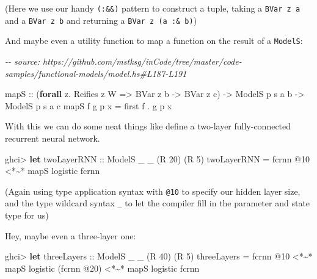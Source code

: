 \documentclass[]{article}
\newenvironment{Shaded}{}{}
\newcommand{\CommentTok}[1]{\textcolor[rgb]{0.38,0.63,0.69}{\textit{#1}}}
\newcommand{\DataTypeTok}[1]{\textcolor[rgb]{0.56,0.13,0.00}{#1}}
\newcommand{\DecValTok}[1]{\textcolor[rgb]{0.25,0.63,0.44}{#1}}
\newcommand{\KeywordTok}[1]{\textcolor[rgb]{0.00,0.44,0.13}{\textbf{#1}}}
\newcommand{\NormalTok}[1]{#1}
\newcommand{\OperatorTok}[1]{\textcolor[rgb]{0.40,0.40,0.40}{#1}}
\newcommand{\OtherTok}[1]{\textcolor[rgb]{0.00,0.44,0.13}{#1}}
\begin{document}
(Here we use our handy \texttt{(:\&\&)} pattern to construct a tuple, taking a
\texttt{BVar\ z\ a} and a \texttt{BVar\ z\ b} and returning a
\texttt{BVar\ z\ (a\ :\&\ b)})

And maybe even a utility function to map a function on the result of a
\texttt{ModelS}:

\begin{Shaded}
\begin{Highlighting}[]
\CommentTok{{-}{-} source: https://github.com/mstksg/inCode/tree/master/code{-}samples/functional{-}models/model.hs\#L187{-}L191}

\NormalTok{mapS}
\OtherTok{    ::}\NormalTok{ (}\KeywordTok{forall}\NormalTok{ z}\OperatorTok{.} \DataTypeTok{Reifies}\NormalTok{ z }\DataTypeTok{W} \OtherTok{=\textgreater{}} \DataTypeTok{BVar}\NormalTok{ z b }\OtherTok{{-}\textgreater{}} \DataTypeTok{BVar}\NormalTok{ z c)}
    \OtherTok{{-}\textgreater{}} \DataTypeTok{ModelS}\NormalTok{ p s a b}
    \OtherTok{{-}\textgreater{}} \DataTypeTok{ModelS}\NormalTok{ p s a c}
\NormalTok{mapS f g p x }\OtherTok{=}\NormalTok{ first f }\OperatorTok{.}\NormalTok{ g p x}
\end{Highlighting}
\end{Shaded}

With this we can do some neat things like define a two-layer fully-connected
recurrent neural network.

\begin{Shaded}
\begin{Highlighting}[]
\NormalTok{ghci}\OperatorTok{\textgreater{}} \KeywordTok{let}\OtherTok{ twoLayerRNN ::} \DataTypeTok{ModelS}\NormalTok{ \_ \_ (}\DataTypeTok{R} \DecValTok{20}\NormalTok{) (}\DataTypeTok{R} \DecValTok{5}\NormalTok{)}
\NormalTok{          twoLayerRNN }\OtherTok{=}\NormalTok{ fcrnn }\OperatorTok{@}\DecValTok{10} \OperatorTok{\textless{}*\textasciitilde{}*}\NormalTok{ mapS logistic fcrnn}
\end{Highlighting}
\end{Shaded}

(Again using type application syntax with \texttt{@10} to specify our hidden
layer size, and the type wildcard syntax \texttt{\_} to let the compiler fill in
the parameter and state type for us)

Hey, maybe even a three-layer one:

\begin{Shaded}
\begin{Highlighting}[]
\NormalTok{ghci}\OperatorTok{\textgreater{}} \KeywordTok{let}\OtherTok{ threeLayers ::} \DataTypeTok{ModelS}\NormalTok{ \_ \_ (}\DataTypeTok{R} \DecValTok{40}\NormalTok{) (}\DataTypeTok{R} \DecValTok{5}\NormalTok{)}
\NormalTok{          threeLayers }\OtherTok{=}\NormalTok{ fcrnn }\OperatorTok{@}\DecValTok{10}
                   \OperatorTok{\textless{}*\textasciitilde{}*}\NormalTok{ mapS logistic (fcrnn }\OperatorTok{@}\DecValTok{20}\NormalTok{)}
                   \OperatorTok{\textless{}*\textasciitilde{}*}\NormalTok{ mapS logistic fcrnn}
\end{Highlighting}
\end{Shaded}
\end{document}
